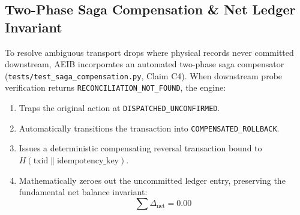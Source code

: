 \documentclass[10pt,journal,compsoc]{IEEEtran}
\begin{document}
\subsection{Two-Phase Saga Compensation \& Net Ledger Invariant}
To resolve ambiguous transport drops where physical records never committed downstream, AEIB incorporates an automated two-phase saga compensator (\texttt{tests/test\_saga\_compensation.py}, Claim C4). When downstream probe verification returns \texttt{RECONCILIATION\_NOT\_FOUND}, the engine:
\begin{enumerate}
    \item Traps the original action at \texttt{DISPATCHED\_UNCONFIRMED}.
    \item Automatically transitions the transaction into \texttt{COMPENSATED\_ROLLBACK}.
    \item Issues a deterministic compensating reversal transaction bound to $H(\text{txid} \parallel \text{idempotency\_key})$.
    \item Mathematically zeroes out the uncommitted ledger entry, preserving the fundamental net balance invariant:
    \begin{equation}
    \sum \Delta_{\text{net}} = 0.00
    \end{equation}
\end{enumerate}
\end{document}
